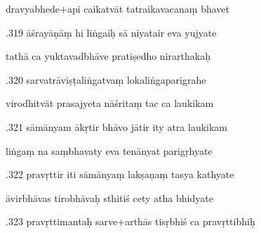 \documentclass[article,12pt,a4paper]{memoir}%
\newcounter{parCount}
\begin{document}
	  
	  \pstart \leavevmode%
	dravyabhede+api caikatvāt tatraikavacanaṃ bhavet 
	{}
	\pend%
      

	  
	  \pstart {}.319 āśrayāṇāṃ hi liṅgaiḥ sā niyatair eva yujyate 
	{}
	\pend%
      

	  
	  \pstart \leavevmode%
	tathā ca yuktavadbhāve pratiṣedho nirarthakaḥ 
	{}
	\pend%
      

	  
	  \pstart {}.320 sarvatrāviṣṭaliṅgatvaṃ lokaliṅgaparigrahe 
	{}
	\pend%
      

	  
	  \pstart \leavevmode%
	virodhitvāt prasajyeta nāśritaṃ tac ca laukikam 
	{}
	\pend%
      

	  
	  \pstart {}.321 sāmānyam ākṛtir bhāvo jātir ity atra laukikam 
	{}
	\pend%
      

	  
	  \pstart \leavevmode%
	liṅgaṃ na saṃbhavaty eva tenānyat parigṛhyate 
	{}
	\pend%
      

	  
	  \pstart {}.322 pravṛttir iti sāmānyaṃ lakṣaṇaṃ tasya kathyate 
	{}
	\pend%
      

	  
	  \pstart \leavevmode%
	āvirbhāvas tirobhāvaḥ sthitiś cety atha bhidyate 
	{}
	\pend%
      

	  
	  \pstart {}.323 pravṛttimantaḥ sarve+arthās tisṛbhiś ca pravṛttibhiḥ 
	{}
	\pend%
      
\end{document}
